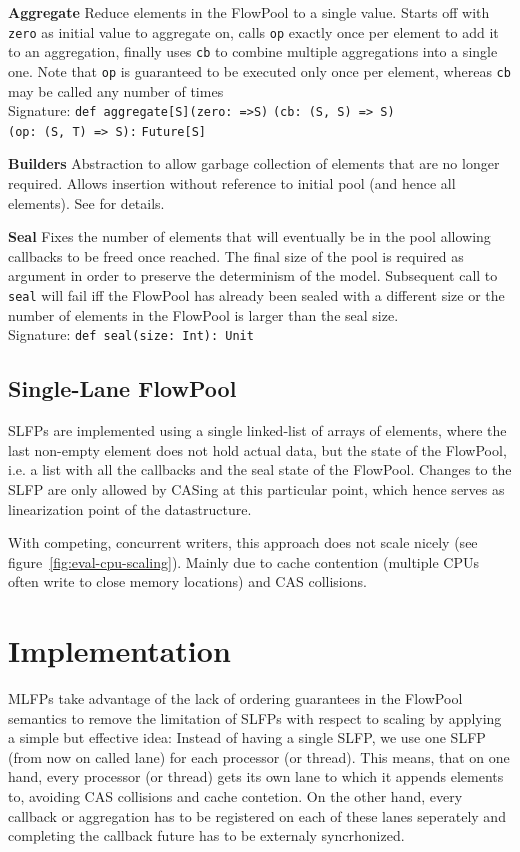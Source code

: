 \documentclass[runningheads,a4paper,fleqn]{llncs}
\begin{document}
\textbf{Aggregate} Reduce elements in the FlowPool to a single
value. Starts off with \verb+zero+ as initial value to aggregate on,
calls \verb+op+ exactly once per element to add it to an aggregation,
finally uses \verb+cb+ to combine multiple aggregations into a single
one. Note that \verb+op+ is guaranteed to be executed only once per
element, whereas \verb+cb+ may be called any number of times\\
Signature: \verb+def aggregate[S]+\verb+(zero: =>S)+
\verb+(cb: (S, S) => S)+\\
\verb+(op: (S, T) => S):+ \verb+Future[S]+

\textbf{Builders} Abstraction to allow garbage collection of elements
that are no longer required. Allows insertion without reference to
initial pool (and hence all elements). See \cite{FP12} for details.

\textbf{Seal} Fixes the number of elements that will eventually be in
the pool allowing callbacks to be freed once reached. The final size
of the pool is required as argument in order to preserve the
determinism of the model. Subsequent call to \verb+seal+ will fail iff
the FlowPool has already been sealed with a different size or the
number of elements in the FlowPool is larger than the seal size.\\
Signature: \verb+def seal(size: Int): Unit+

\subsection{Single-Lane FlowPool}
SLFPs are implemented using a single linked-list of arrays of
elements, where the last non-empty element does not hold actual data,
but the state of the FlowPool, i.e. a list with all the callbacks and
the seal state of the FlowPool. Changes to the SLFP are only allowed
by CASing at this particular point, which hence serves as
linearization point of the datastructure.

With competing, concurrent writers, this approach does not scale
nicely (see figure~\ref{fig:eval-cpu-scaling}). Mainly due to cache
contention (multiple CPUs often write to close memory locations) and
CAS collisions.

\section{Implementation}
MLFPs take advantage of the lack of ordering guarantees in the
FlowPool semantics to remove the limitation of SLFPs with respect to
scaling by applying a simple but effective idea: Instead of having a
single SLFP, we use one SLFP (from now on called lane) for each
processor (or thread). This means, that on one hand, every processor
(or thread) gets its own lane to which it appends elements to,
avoiding CAS collisions and cache contetion. On the other hand, every
callback or aggregation has to be registered on each of these lanes
seperately and completing the callback future has to be externaly
syncrhonized.
\end{document}
